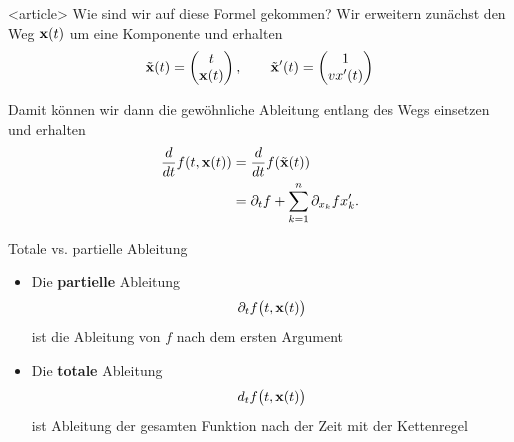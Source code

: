 \begin{onlyenv}<article>
  Wie sind wir auf diese Formel gekommen?
  Wir erweitern zunächst den Weg $\mathbf{x}(t)$ um eine Komponente und erhalten
  \begin{gather*}
    \tilde{\mathbf{x}}(t) =
    \begin{pmatrix}
      t\\\mathbf{x}(t)
    \end{pmatrix},\qquad
    \tilde{\mathbf{x}}'(t) =
    \begin{pmatrix}
      1\\vx'(t)
    \end{pmatrix}
  \end{gather*}
  
  Damit können wir dann die gewöhnliche Ableitung entlang des Wegs einsetzen und erhalten
  \begin{align*}
    \frac{d}{dt}f(t,\mathbf{x}(t))
    &= \frac{d}{dt}f(\tilde{\mathbf{x}}(t))\\
    &= \partial_t f + \sum_{k=1}^n \partial_{x_k} f x_k'.
  \end{align*}
\end{onlyenv}

\begin{frame}{Totale vs. partielle Ableitung}
  \begin{itemize}
  \item Die \textbf{partielle} Ableitung
    \begin{gather*}
      \partial_t f\bigl(t,\mathbf{x}(t)\bigr)
    \end{gather*}
    ist die Ableitung von $f$ nach dem ersten Argument
  \item Die \textbf{totale} Ableitung
    \begin{gather*}
      d_t f\bigl(t,\mathbf{x}(t)\bigr)
    \end{gather*}
    ist Ableitung der gesamten Funktion nach der Zeit mit der Kettenregel
  \end{itemize}
\end{frame}


